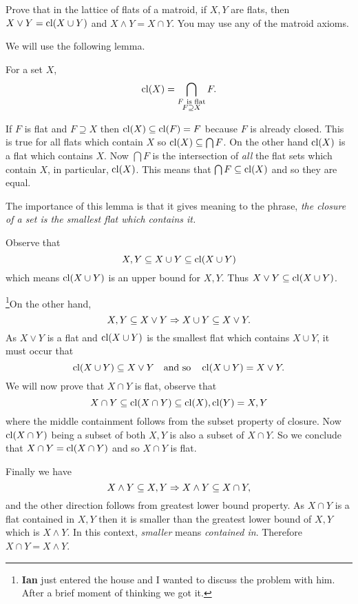 \documentclass[12pt]{memoir}
\begin{document}
\begin{Ej}[Exercise 3]
Prove that in the lattice of flats of a matroid, if $X,Y$ are flats, then $X\lor Y=\operatorname{cl}(X\cup Y)$ and $X\land Y=X\cap Y$. You may use any of the matroid axioms.
\end{Ej}

We will use the following lemma.
\begin{Lem}
For a set $X$, 
$$\operatorname{cl}(X)=\bigcap_{\substack{F\ \text{is flat}\\ F\supseteq X}} F.$$
\end{Lem}

\begin{ptcbp}
If $F$ is flat and $F\supseteq X$ then $\operatorname{cl}(X)\subseteq\operatorname{cl}(F)=F$ because $F$ is already closed. This is true for all flats which contain $X$ so $\operatorname{cl}(X)\subseteq\bigcap F$.
On the other hand $\operatorname{cl}(X)$ is a flat which contains $X$. Now $\bigcap F$ is the intersection of \emph{all} the flat sets which contain $X$, in particular, $\operatorname{cl}(X)$. This means that $\bigcap F\subseteq \operatorname{cl}(X)$ and so they are equal.
\end{ptcbp}

The importance of this lemma is that it gives meaning to the phrase, \emph{the closure of a set is the smallest flat which contains it.}
\begin{ptcbr}
    Observe that 
    $$X,Y\subseteq X\cup Y\subseteq\operatorname{cl}(X\cup Y)$$
    which means $\operatorname{cl}(X\cup Y)$ is an upper bound for $X,Y$. Thus $X\lor Y\subseteq \operatorname{cl}(X\cup Y)$.\par 
    \footnote{\textbf{Ian} just entered the house and I wanted to discuss the problem with him. After a brief moment of thinking we got it.}On the other hand, 
    $$X,Y\subseteq X\lor Y\Rightarrow X\cup Y\subseteq X\lor Y.$$
    As $X\lor Y$ is a flat and $\operatorname{cl}(X\cup Y)$ is the smallest flat which contains $X\cup Y$, it must occur that 
    $$\operatorname{cl}(X\cup Y)\subseteq X\lor Y\quad\text{and so}\quad\operatorname{cl}(X\cup Y)=X\lor Y.$$
    We will now prove that $X\cap Y$ is flat, observe that 
    $$X\cap Y\subseteq \operatorname{cl}(X\cap Y)\subseteq\operatorname{cl}(X),\operatorname{cl}(Y)=X,Y$$
    where the middle containment follows from the subset property of closure. Now $\operatorname{cl}(X\cap Y)$ being a subset of both $X,Y$ is also a subset of $X\cap Y$. So we conclude that $X\cap Y=\operatorname{cl}(X\cap Y)$ and so $X\cap Y$ is flat.\par 
    Finally we have 
    $$X\land Y\subseteq X,Y\Rightarrow X\land Y\subseteq X\cap Y,$$
    and the other direction follows from greatest lower bound property. As $X\cap Y$ is a flat contained in $X,Y$ then it is smaller than the greatest lower bound of $X,Y$ which is $X\land Y$. In this context, \emph{smaller} means \emph{contained in}. Therefore $X\cap Y=X\land Y$.
\end{ptcbr}
\end{document}
